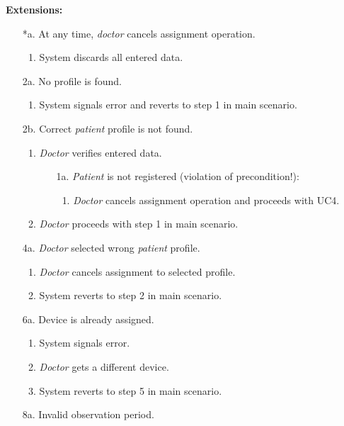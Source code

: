 \documentclass[fontsize=12pt,
               paper=a4,
               twoside=false,
               parskip=half,
               ]{scrartcl}
\begin{document}
\textbf{\textsf{Extensions:}}

\begin{itemize}[leftmargin=3em]
	\item[*a.] At any time, \emph{doctor} cancels assignment operation.
	\begin{enumerate}
		\item System discards all entered data.
	\end{enumerate}
	\item[2a.] No profile is found.
	\begin{enumerate}
		\item System signals error and reverts to step 1 in main scenario.
	\end{enumerate}
	\item[2b.] Correct \emph{patient} profile is not found.
	\begin{enumerate}
		\item \emph{Doctor} verifies entered data.
		\begin{itemize}
			\item[1a.] \emph{Patient} is not registered (violation of precondition!):
			\begin{enumerate}[label=\arabic*.]
				\item \emph{Doctor} cancels assignment operation and proceeds with UC4.
			\end{enumerate}
		\end{itemize}
		\item \emph{Doctor} proceeds with step 1 in main scenario.
	\end{enumerate}
	\item[4a.] \emph{Doctor} selected wrong \emph{patient} profile.
	\begin{enumerate}
		\item \emph{Doctor} cancels assignment to selected profile.
		\item System reverts to step 2 in main scenario.
	\end{enumerate}
	\item[6a.] Device is already assigned.
	\begin{enumerate}
		\item System signals error.
		\item \emph{Doctor} gets a different device.
		\item System reverts to step 5 in main scenario.
	\end{enumerate}
	\item[8a.] Invalid observation period.
	\begin{enumerate}

\end{enumerate}
\end{itemize}
\end{document}
